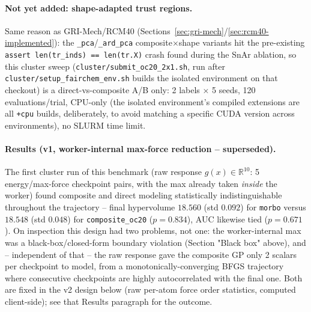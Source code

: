 \documentclass[11pt]{article}
\begin{document}
\paragraph{Not yet added: shape-adapted trust regions.} Same reason as
GRI-Mech/RCM40 (Sections~\ref{sec:gri-mech}/\ref{sec:rcm40-implemented}):
the \texttt{\_pca}/\texttt{\_ard\_pca} composite$\times$shape variants
hit the pre-existing \texttt{assert len(tr\_inds) == len(tr.X)} crash
found during the SnAr ablation, so this cluster sweep
(\texttt{cluster/submit\_oc20\_2x1.sh}, run after
\texttt{cluster/setup\_fairchem\_env.sh} builds the isolated environment
on that checkout) is a direct-vs-composite A/B only: 2 labels $\times$
5 seeds, 120 evaluations/trial, CPU-only (the isolated environment's
compiled extensions are all \texttt{+cpu} builds, deliberately, to avoid
matching a specific CUDA version across environments), no SLURM time
limit.

\paragraph{Results (v1, worker-internal max-force reduction --
superseded).} The first cluster run of this benchmark (raw response
$g(x) \in \mathbb{R}^{10}$: 5 energy/max-force checkpoint pairs, with
the max already taken \emph{inside} the worker) found composite and
direct modeling statistically indistinguishable throughout the
trajectory -- final hypervolume $18.560$ (std $0.092$) for
\texttt{morbo} versus $18.548$ (std $0.048$) for
\texttt{composite\_oc20} ($p=0.834$), AUC likewise tied ($p=0.671$). On
inspection this design had two problems, not one: the worker-internal
max was a black-box/closed-form boundary violation (Section
"Black box" above), and -- independent of that -- the raw response gave
the composite GP only 2 scalars per checkpoint to model, from a
monotonically-converging BFGS trajectory where consecutive checkpoints
are highly autocorrelated with the final one. Both are fixed in the
v2 design below (raw per-atom force order statistics, computed
client-side); see that Results paragraph for the outcome.
\end{document}
